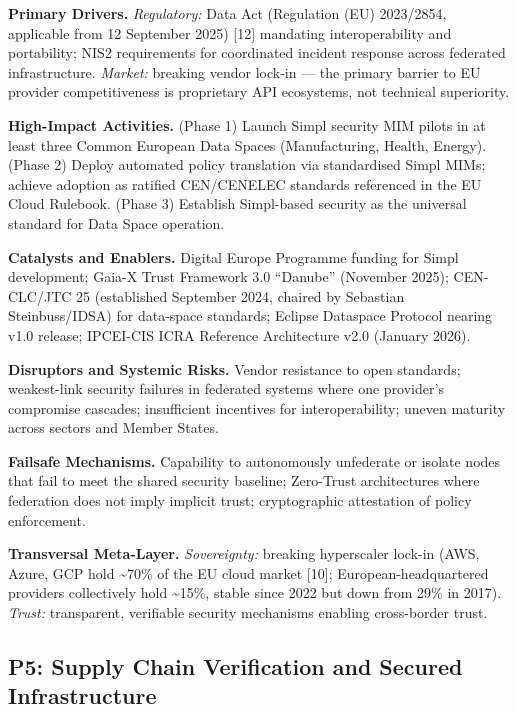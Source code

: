 \documentclass{ieeeaccess}
\begin{document}
\textbf{Primary Drivers.} \emph{Regulatory:} Data Act (Regulation (EU)
2023/2854, applicable from 12 September 2025) {[}12{]} mandating
interoperability and portability; NIS2 requirements for coordinated
incident response across federated infrastructure. \emph{Market:}
breaking vendor lock-in --- the primary barrier to EU provider
competitiveness is proprietary API ecosystems, not technical
superiority.

\textbf{High-Impact Activities.} (Phase 1) Launch Simpl security MIM
pilots in at least three Common European Data Spaces (Manufacturing,
Health, Energy). (Phase 2) Deploy automated policy translation via
standardised Simpl MIMs; achieve adoption as ratified CEN/CENELEC
standards referenced in the EU Cloud Rulebook. (Phase 3) Establish
Simpl-based security as the universal standard for Data Space operation.

\textbf{Catalysts and Enablers.} Digital Europe Programme funding for
Simpl development; Gaia-X Trust Framework 3.0 ``Danube'' (November
2025); CEN-CLC/JTC 25 (established September 2024, chaired by Sebastian
Steinbuss/IDSA) for data-space standards; Eclipse Dataspace Protocol
nearing v1.0 release; IPCEI-CIS ICRA Reference Architecture v2.0
(January 2026).

\textbf{Disruptors and Systemic Risks.} Vendor resistance to open
standards; weakest-link security failures in federated systems where one
provider's compromise cascades; insufficient incentives for
interoperability; uneven maturity across sectors and Member States.

\textbf{Failsafe Mechanisms.} Capability to autonomously unfederate or
isolate nodes that fail to meet the shared security baseline; Zero-Trust
architectures where federation does not imply implicit trust;
cryptographic attestation of policy enforcement.

\textbf{Transversal Meta-Layer.} \emph{Sovereignty:} breaking
hyperscaler lock-in (AWS, Azure, GCP hold \textasciitilde70\% of the EU
cloud market {[}10{]}; European-headquartered providers collectively
hold \textasciitilde15\%, stable since 2022 but down from 29\% in 2017).
\emph{Trust:} transparent, verifiable security mechanisms enabling
cross-border trust.

\subsection{P5: Supply Chain Verification and Secured
Infrastructure}\label{p5-supply-chain-verification-and-secured-infrastructure}
\end{document}
